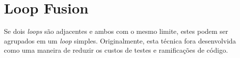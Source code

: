 
\section{Loop Fusion}

Se dois \textit{loops} são adjacentes e ambos com o mesmo limite, estes podem
ser agrupados em um \textit{loop} simples.
Originalmente, esta técnica fora desenvolvida como uma maneira de reduzir os
custos de testes e ramificações de código.

